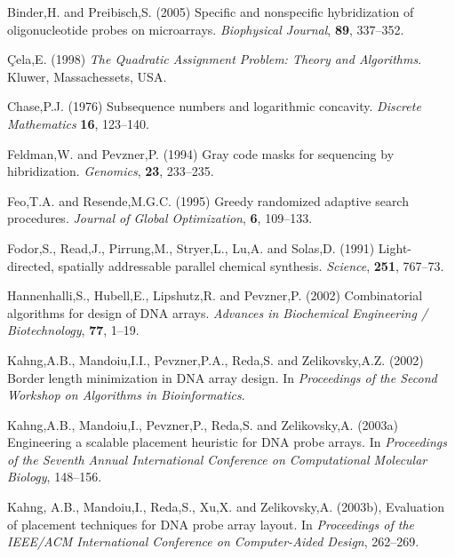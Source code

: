 \documentclass[english]{lni}
\begin{document}
\begin{thebibliography}{}

 Binder,H. and Preibisch,S. (2005)
Specific and nonspecific hybridization of oligonucleotide probes on microarrays.
{\it Biophysical Journal}, {\bf 89}, 337--352.

 \c{C}ela,E. (1998) {\it The Quadratic
Assignment Problem: Theory and Algorithms}. Kluwer, Massachessets, USA.

 Chase,P.J. (1976) Subsequence numbers and
logarithmic concavity. {\it Discrete Mathematics} {\bf 16}, 123--140.

 Feldman,W. and Pevzner,P. (1994)
Gray code masks for sequencing by hibridization. {\it Genomics}, {\bf 23},
233--235.

 Feo,T.A. and Resende,M.G.C. (1995) Greedy
randomized adaptive search procedures. {\it Journal of Global Optimization},
{\bf 6}, 109--133.

 Fodor,S., Read,J., Pirrung,M.,
Stryer,L., Lu,A. and Solas,D. (1991) Light-directed, spatially addressable
parallel chemical synthesis. {\it Science}, {\bf 251}, 767--73.

 Hannenhalli,S.,
Hubell,E., Lipshutz,R. and Pevzner,P. (2002) Combinatorial algorithms for design
of DNA arrays. {\it Advances in Biochemical Engineering / Biotechnology},
{\bf 77}, 1--19.

 Kahng,A.B., Mandoiu,I.I.,
Pevzner,P.A., Reda,S. and Zelikovsky,A.Z. (2002) Border length minimization in
DNA array design. In {\it Proceedings of the Second Workshop on Algorithms in
Bioinformatics}.

 Kahng,A.B., Mandoiu,I.,
Pevzner,P., Reda,S. and Zelikovsky,A. (2003a) Engineering a scalable placement
heuristic for DNA probe arrays. In {\it Proceedings of the Seventh Annual
International Conference on Computational Molecular Biology}, 148--156.

 Kahng, A.B., Mandoiu,I., Reda,S.,
Xu,X. and Zelikovsky,A. (2003b), Evaluation of placement techniques for DNA
probe array layout. In {\it Proceedings of the IEEE/ACM International Conference
on Computer-Aided Design}, 262--269.


\end{thebibliography}
\end{document}
